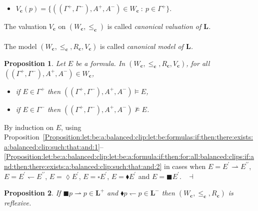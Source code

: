 \documentclass[draft]{article}
\newtheorem{proposition}{Proposition}
\newenvironment{proof}{{\bf Proof:}}{~$\dashv$\\}
\def\L{\mathbf{L}}
\begin{document}
%
%
\begin{itemize}
%
%
\item $V_{\mathbf{c}}(p){=}\{((\Gamma^{+},\Gamma^{-}),A^{+},A^{-}){\in}W_{\mathbf{c}}\ :\ p{\in}\Gamma^{+}\}$.
%
%
\end{itemize}
%
%
The valuation $V_{\mathbf{c}}$ on $(W_{\mathbf{c}},{\leq_{\mathbf{c}}})$ is called {\em canonical valuation of $\L$.}
%
%
\\
\\
%
%
The model $(W_{\mathbf{c}},{\leq_{\mathbf{c}}},{R_{\mathbf{c}}},V_{\mathbf{c}})$ is called {\em canonical model of $\L$.}
%
%
\begin{proposition}\label{Proposition:let:be:a:formula:for:all}
%
%
Let $E$ be a formula.
In $(W_{\mathbf{c}},{\leq_{\mathbf{c}}},{R_{\mathbf{c}}},V_{\mathbf{c}})$, for all $((\Gamma^{+},\Gamma^{-}),A^{+},A^{-})
%
%
%
%
%
%
%
$\linebreak$
%
%
%
%
%
%
{\in}W_{\mathbf{c}}$,
%
%
\begin{itemize}
%
%
\item if $E{\in}\Gamma^{+}$ then $((\Gamma^{+},\Gamma^{-}),A^{+},A^{-}){\models}E$,
%
%
\item if $E{\in}\Gamma^{-}$ then $((\Gamma^{+},\Gamma^{-}),A^{+},A^{-}){\not\models}E$.
%
%
\end{itemize}
%
%
\end{proposition}
%
%
\begin{proof}
%
%
By induction on $E$, using Proposition~\ref{Proposition:let:be:a:balanced:clip:let:be:formulas:if:then:there:exists:a:balanced:clip:such:that:and:1}--\ref{Proposition:let:be:a:balanced:clip:let:be:a:formula:if:then:for:all:balanced:clips:if:and:then:there:exists:a:balanced:clip:such:that:and:2} in cases when $E{=}E^{\prime}{\rightharpoonup}E^{\prime\prime}$, $E{=}E^{\prime}
%
%
%
%
%
%
%
$\linebreak$
%
%
%
%
%
%
{\leftharpoondown}E^{\prime\prime}$, $E{=}{\lozenge}E^{\prime}$, $E{=}{\square}E^{\prime}$, $E{=}{\blacklozenge}E^{\prime}$ and $E{=}{\blacksquare}E^{\prime}$.
%
%
\medskip
%
%
\end{proof}
%
%
\begin{proposition}\label{Proposition:the:following:conditions:are:equivalent:is:reflexive}
%
%
If ${\blacksquare}p{\rightharpoonup}p{\in}\L^{+}$ and ${\blacklozenge}p{\leftharpoondown}p{\in}\L^{-}$ then $(W_{\mathbf{c}},{\leq_{\mathbf{c}}},{R_{\mathbf{c}}})$ is reflexive.
%
%
\end{proposition}
%
%
\end{document}
